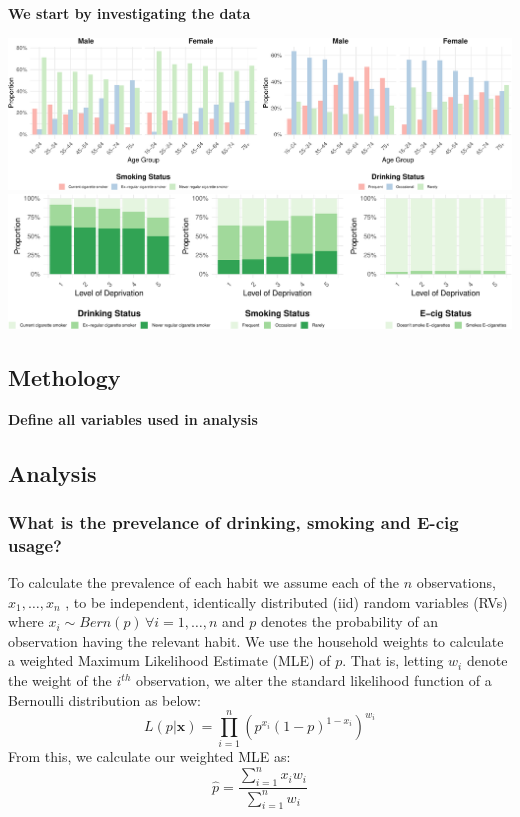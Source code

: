 \documentclass[
  11pt,
]{article}
\begin{document}
\textbf{We start by investigating the data}

\includegraphics{Coursework_files/figure-latex/output smoking and drinking by age plot-1.pdf}
\\

\includegraphics{Coursework_files/figure-latex/output deprivation plot-1.pdf}\\

\subsection{Methology}\label{methology}

\textbf{Define all variables used in analysis}

\subsection{Analysis}\label{analysis}

\subsubsection{What is the prevelance of drinking, smoking and E-cig
usage?}\label{what-is-the-prevelance-of-drinking-smoking-and-e-cig-usage}

To calculate the prevalence of each habit we assume each of the \(n\)
observations, \(x_1,…,x_n\) , to be independent, identically distributed
(iid) random variables (RVs) where
\(x_i \sim Bern(p)\, \forall i=1,…,n\) and \(p\) denotes the probability
of an observation having the relevant habit. We use the household
weights to calculate a weighted Maximum Likelihood Estimate (MLE) of
\(p\). That is, letting \(w_i\) denote the weight of the \(i^{th}\)
observation, we alter the standard likelihood function of a Bernoulli
distribution as below:
\[L(p|\textbf{x}) = \prod_{i = 1}^{n} (p^{x_i}(1-p)^{1-x_i})^{w_i}\]
From this, we calculate our weighted MLE as:
\[\widehat{p} = \frac{\sum_{i=1}^{n} x_iw_i}{\sum_{i=1}^{n} w_i}\]
\end{document}

